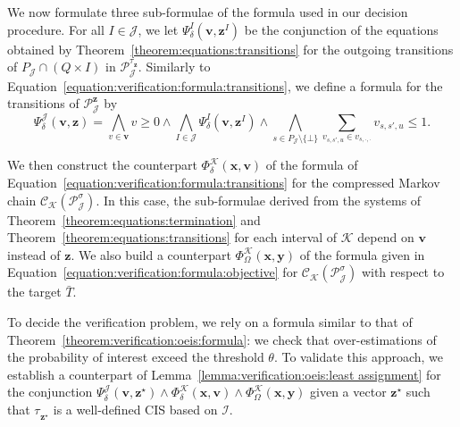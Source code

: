 \documentclass[a4paper,UKenglish,cleveref,autoref,thm-restate,colorlinks]{lipics-v2021}
\newcommand{\weightVal}{u}
\newcommand{\ocStateSpace}{Q}
\newcommand{\ocConfig}{s}
\newcommand{\ocTrans}{\delta}
\newcommand{\mchain}{\mathcal{C}}
\newcommand{\ocChain}{\mathcal{P}}
\newcommand{\intPart}{\mathcal{I}}
\newcommand{\intPartB}{\mathcal{J}}
\newcommand{\intPartC}{\mathcal{K}}
\newcommand{\interval}{I}
\newcommand{\cisChainStrat}[1]{\ocChain^{#1}_{\intPartB}}
\newcommand{\cisChain}{\cisChainStrat{\strat}}
\newcommand{\cisChainStateSpace}{P_{\intPartB}}
\newcommand{\compressCis}{\mchain_{\intPartC}({\cisChain})}
\newcommand{\varTrans}{x}
\newcommand{\varTransTuple}{\mathbf{\varTrans}}
\newcommand{\varObj}{y}
\newcommand{\varObjTuple}{\mathbf{\varObj}}
\newcommand{\varStrat}{z}
\newcommand{\varStratI}{\mathbf{\varStrat}^{\interval}}
\newcommand{\varStratTuple}{\mathbf{\varStrat}}
\newcommand{\solStratTuple}{\mathbf{\varStrat}^{\star}}
\newcommand{\varCis}{v}
\newcommand{\varCisTuple}{\mathbf{\varCis}}
\newcommand{\cisChainSymbolic}{\cisChainStrat{\varStratTuple}}
\newcommand{\formulaTransBase}{\Phi_{\ocTrans}}
\newcommand{\formulaObjBase}{\Phi_{\objective}}
\newcommand{\formulaCisBase}{\Psi_{\ocTrans}}
\newcommand{\formulaCis}{\formulaCisBase^\intPartB}
\newcommand{\formulaCisI}{\formulaCisBase^\interval}
\newcommand{\formulaCisTrans}{\formulaTransBase^\intPartC}
\newcommand{\formulaCisObj}{\formulaObjBase^\intPartC}
\newcommand{\objective}{\Omega}
\newcommand{\target}{T}
\newcommand{\thresProba}{\theta}
\newcommand{\stratGeneric}[1]{{\sigma_{#1}}}
\newcommand{\strat}{\stratGeneric{}}
\newcommand{\stratBGeneric}[1]{{\tau_{#1}}}
\newcommand{\stratB}{\stratBGeneric{}}
\begin{document}
We now formulate three sub-formulae of the formula used in our decision procedure.
For all $\interval\in\intPartB$, we let $\formulaCisI(\varCisTuple, \varStratI)$ be the conjunction of the equations obtained by Theorem~\ref{theorem:equations:transitions} for the outgoing transitions of $\cisChainStateSpace\cap(\ocStateSpace\times\interval)$ in $\cisChainStrat{\stratB_{\varStratTuple}}$.
Similarly to Equation~\eqref{equation:verification:formula:transitions}, we define a formula for the transitions of $\cisChainSymbolic$ by
\begin{equation}\label{equation:verification:formula:transitions:cis}
  \formulaCis(\varCisTuple, \varStratTuple) =
  \bigwedge_{\varCis\in\varCisTuple}\varCis\geq 0\land
  \bigwedge_{\interval\in\intPartB}
  \formulaCisI(\varCisTuple, \varStratI)\land
  \bigwedge_{\ocConfig\in\cisChainStateSpace\setminus\{\bot\}}
  \sum_{\varCis_{\ocConfig, \ocConfig', \weightVal}\in\varCis_{\ocConfig, \cdot, \cdot}}\varCis_{\ocConfig, \ocConfig', \weightVal}\leq 1.
\end{equation}

We then construct the counterpart $\formulaCisTrans(\varTransTuple, \varCisTuple)$ of the formula of Equation~\eqref{equation:verification:formula:transitions} for the compressed Markov chain $\compressCis$.
In this case, the sub-formulae derived from the systems of Theorem~\ref{theorem:equations:termination} and Theorem~\ref{theorem:equations:transitions} for each interval of $\intPartC$ depend on $\varCisTuple$ instead of $\varStratTuple$.
We also build a counterpart $\formulaCisObj(\varTransTuple, \varObjTuple)$ of the formula given in Equation~\eqref{equation:verification:formula:objective} for $\compressCis$ with respect to the target $\bar{\target}$.

To decide the verification problem, we rely on a formula similar to that of Theorem~\ref{theorem:verification:oeis:formula}: we check that over-estimations of the probability of interest exceed the threshold $\thresProba$.
To validate this approach, we establish a counterpart of Lemma~\ref{lemma:verification:oeis:least assignment} for the conjunction $\formulaCis(\varCisTuple, \solStratTuple)\land\formulaCisTrans(\varTransTuple, \varCisTuple)\land\formulaCisObj(\varTransTuple,\varObjTuple)$ given a vector $\solStratTuple$ such that $\stratB_{\solStratTuple}$ is a well-defined CIS based on $\intPart$.
\end{document}
